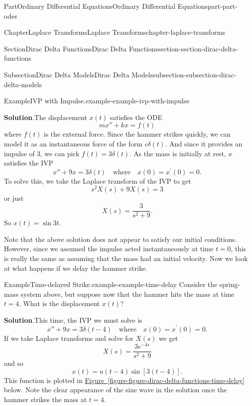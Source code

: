 \documentclass[twoside,10pt,]{book}
\newcommand{\blocktitlefont}{\relax}
\newcommand{\xreffont}{\relax}
\numberwithin{equation}{part}
\newcommand{\qq}[1]{\quad\text{#1}\quad}
\begin{document}
\begin{partptx}{Part}{Ordinary Differential Equations}{}{Ordinary Differential Equations}{}{}{part-part-odes}
\begin{chapterptx}{Chapter}{Laplace Transforms}{}{Laplace Transforms}{}{}{chapter-laplace-transforms}
\begin{sectionptx}{Section}{Dirac Delta Functions}{}{Dirac Delta Functions}{}{}{section-section-dirac-delta-functions}
\begin{subsectionptx}{Subsection}{Dirac Delta Models}{}{Dirac Delta Models}{}{}{subsection-subsection-dirac-delta-models}
\begin{example}{Example}{IVP with Impulse.}{example-example-ivp-with-impulse}
\par\smallskip%
\noindent\textbf{\blocktitlefont Solution}.\hypertarget{solution-example-ivp-with-impulse-c}{}\quad{}The displacement \(x(t)\) satisfies the ODE%
\begin{equation*}
mx''+kx = f(t)
\end{equation*}
where \(f(t)\) is the external force. Since the hammer strikes quickly, we can model it as an instantaneous force of the form \(c\delta(t)\). And since it provides an impulse of \(3\), we can pick \(f(t) = 3\delta(t)\). As the mass is initially at rest, \(x\) satisfies the IVP%
\begin{equation*}
x''+9x = 3\delta(t)\qq{where}x(0) = x^{\prime}(0) = 0.
\end{equation*}
To solve this, we take the Laplace transform of the IVP to get%
\begin{equation*}
s^{2}X(s)+9X(s) = 3
\end{equation*}
or just%
\begin{equation*}
X(s) = \frac{3}{s^{2}+9}.
\end{equation*}
So \(x(t) = \sin3t\).%
\end{example}
Note that the above solution does not appear to satisfy our initial conditions. However, since we assumed the impulse acted instantaneously at time \(t=0\), this is really the same as assuming that the mass had an initial velocity. Now we look at what happens if we delay the hammer strike.%
\begin{example}{Example}{Time-delayed Strike.}{example-example-time-delay}%
Consider the spring-mass system above, but suppose now that the hammer hits the mass at time \(t=4\). What is the displacement \(x(t)\)?%
\par\smallskip%
\noindent\textbf{\blocktitlefont Solution}.\hypertarget{solution-example-time-delay-c}{}\quad{}This time, the IVP we must solve is%
\begin{equation*}
x''+9x = 3\delta(t-4)\qq{where}x(0)=x^{\prime}(0)=0.
\end{equation*}
If we take Laplace transforms and solve for \(X(s)\) we get%
\begin{equation*}
X(s) = \frac{3e^{-4s}}{s^{2}+9}
\end{equation*}
and so%
\begin{equation*}
x(t) = u(t-4)\sin[3(t-4)]\text{.}
\end{equation*}
This function is plotted in \hyperref[figure-figure-dirac-delta-functions-time-delay]{Figure~{\xreffont\ref{figure-figure-dirac-delta-functions-time-delay}}} below. Note the clear appearance of the sine wave in the solution once the hammer strikes the mass at \(t = 4\).%

\end{example}
\end{subsectionptx}
\end{sectionptx}
\end{chapterptx}
\end{partptx}
\end{document}
